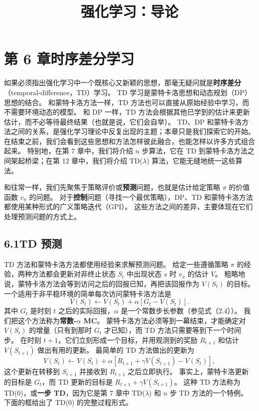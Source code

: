 \documentclass[UTF8, 12pt, fontset=fandol, oneside]{ctexart}
\title{强化学习：导论}
\author{}
\date{}
\begin{document}
\maketitle

\section*{第 6 章\quad 时序差分学习}

如果必须指出强化学习中一个既核心又新颖的思想，那毫无疑问就是\textbf{时序差分}（temporal-difference，TD）学习。
TD 学习是蒙特卡洛思想和动态规划（DP）思想的结合。
和蒙特卡洛方法一样，TD 方法也可以直接从原始经验中学习，而不需要环境动态的模型。
和 DP 一样，TD 方法会根据其他已学到的估计来更新估计，而不必等待最终结果（也就是说，它们会自举）。
TD、DP 和蒙特卡洛方法之间的关系，是强化学习理论中反复出现的主题；本章只是我们探索它的开始。
在结束之前，我们会看到这些思想和方法怎样彼此融合，也能怎样以许多方式组合起来。
特别地，在第 7 章中，我们将介绍 $n$ 步算法，它在 TD 到蒙特卡洛方法之间架起桥梁；在第 12 章中，我们将介绍 TD($\lambda$) 算法，它能无缝地统一这些算法。

和往常一样，我们先聚焦于策略评价或\textbf{预测}问题，也就是估计给定策略 $\pi$ 的价值函数 $v_\pi$ 的问题。
对于\textbf{控制}问题（寻找一个最优策略），DP、TD 和蒙特卡洛方法都使用某种形式的广义策略迭代（GPI）。
这些方法之间的差异，主要体现在它们处理预测问题的方式上。

\subsection*{6.1\quad TD 预测}

TD 方法和蒙特卡洛方法都使用经验来求解预测问题。
给定一些遵循策略 $\pi$ 的经验，两种方法都会更新对非终止状态 $S_t$ 中出现状态 $s$ 时 $v_\pi$ 的估计 $V$。
粗略地说，蒙特卡洛方法会等到访问之后的回报已知，再把该回报作为 $V(S_t)$ 的目标。
一个适用于非平稳环境的简单每次访问蒙特卡洛方法是
\begin{equation}
V(S_t)\leftarrow V(S_t)+\alpha\left[G_t-V(S_t)\right].
\end{equation}
其中 $G_t$ 是时刻 $t$ 之后的实际回报，$\alpha$ 是一个常数步长参数（参见式（2.4））。
我们把这个方法称为\textbf{常数-$\alpha$ MC}。
蒙特卡洛方法必须等到一幕结束，才能确定对 $V(S_t)$ 的增量（只有到那时 $G_t$ 才已知），而 TD 方法只需要等到下一个时间步。
在时刻 $t+1$，它们立刻形成一个目标，并用观测到的奖励 $R_{t+1}$ 和估计 $V(S_{t+1})$ 做出有用的更新。
最简单的 TD 方法做出的更新为
\begin{equation}
V(S_t)\leftarrow V(S_t)+\alpha\left[R_{t+1}+\gamma V(S_{t+1})-V(S_t)\right],
\end{equation}
这个更新在转移到 $S_{t+1}$ 并接收到 $R_{t+1}$ 之后立即执行。
事实上，蒙特卡洛更新的目标是 $G_t$，而 TD 更新的目标是 $R_{t+1}+\gamma V(S_{t+1})$。
这种 TD 方法称为 TD(0)，或\textbf{一步 TD}，因为它是第 7 章中 TD($\lambda$) 和 $n$ 步 TD 方法的一个特例。
下面的框给出了 TD(0) 的完整过程形式。
\end{document}
